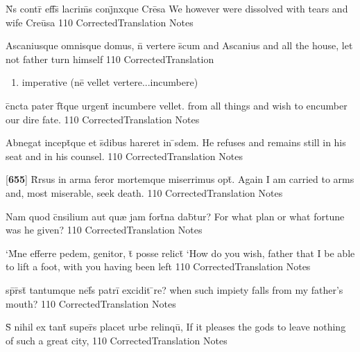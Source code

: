 \latline
  {N\={}s contr\={} eff\={}s\={\macron {\i}} lacrim\={\macron {\i}}s conj\={}nxque Cre\={}sa}
  { We however were dissolved with tears and wife Cre\={u}sa }
  {110}
  { CorrectedTranslation }
  { Notes }


\latline
  {Ascaniusque omnisque domus, n\={} vertere s\={}cum}
  { and Ascanius and all the house, let not father turn himself }
  {110}
  { CorrectedTranslation }
  { \begin{enumerate}
  	\item imperative (n\={e} vellet vertere...incumbere)
  \end{enumerate} }


\latline
  {c\={}ncta pater f\={}t\={}que urgent\={\macron {\i}} incumbere vellet.}
  { from all things and wish to encumber our dire fate. }
  {110}
  { CorrectedTranslation }
  { Notes }


\latline
  {Abnegat incept\={}que et s\={}dibus hareret in \={\macron {\i}}sdem.}
  { He refuses and remains still in his seat and in his counsel. }
  {110}
  { CorrectedTranslation }
  { Notes }


\latline
  {[\textbf{655}] R\={}rsus in arma feror mortemque miserrimus opt\={}.}
  { Again I am carried to arms and, most miserable, seek death.  }
  {110}
  { CorrectedTranslation }
  { Notes }


\latline
  {Nam quod c\={}nsilium aut qu{\ae} jam fort\={}na dab\={}tur?}
  { For what plan or what fortune was he given? }
  {110}
  { CorrectedTranslation }
  { Notes }


\latline
  {`M\={}ne efferre pedem, genitor, t\={} posse relict\={}}
  { `How do you wish, father that I be able to lift a foot, with you having been left }
  {110}
  { CorrectedTranslation }
  { Notes }


\latline
  {sp\={}r\={}st\={\macron {\i}} tantumque nef\={}s patri\={} excidit \={}re?}
  { when such impiety falls from my father's mouth? }
  {110}
  { CorrectedTranslation }
  { Notes }


\latline
  {S\={\macron {\i}} nihil ex tant\={} super\={\macron {\i}}s placet urbe relinqu\={\macron {\i}},}
  { If it pleases the gods to leave nothing of such a great city, }
  {110}
  { CorrectedTranslation }
  { Notes }


